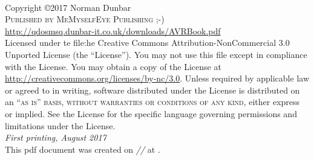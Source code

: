 \documentclass[11pt,fleqn]{book} %
\begin{document}



\newpage
~\vfill
\thispagestyle{empty}

\noindent Copyright \copyright 2017 Norman Dunbar\\ %

\noindent \textsc{Published by MeMyselfEye Publishing ;-)}\\ %

\noindent \url{http://qdosmsq.dunbar-it.co.uk/downloads/AVRBook.pdf}\\ %

\noindent Licensed under te file:he Creative Commons Attribution-NonCommercial 3.0 Unported License (the ``License''). You may not use this file except in compliance with the License. You may obtain a copy of the License at \url{http://creativecommons.org/licenses/by-nc/3.0}. Unless required by applicable law or agreed to in writing, software distributed under the License is distributed on an \textsc{``as is'' basis, without warranties or conditions of any kind}, either express or implied. See the License for the specific language governing permissions and limitations under the License.\\ %

\noindent \textit{First printing, August 2017} \\%


\noindent This pdf document was created on \textit{\the\day/\the\month/\the\year} at \textit{\DTMcurrenttime}.



\pagestyle{empty} %


\tableofcontents %
\listoftables
\listoffigures
\lstlistoflistings
\end{document}
